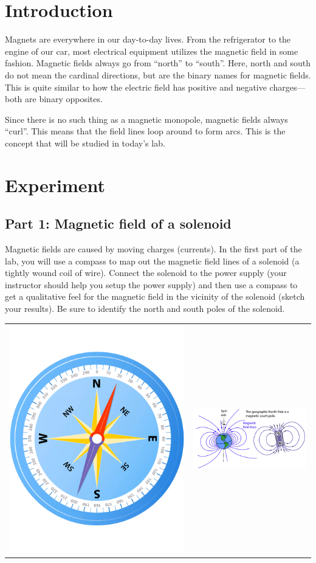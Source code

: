 \documentclass[12pt]{article}
\begin{document}
	\section*{Introduction}
	Magnets are everywhere in our day-to-day lives. From the refrigerator to the engine of our car, most electrical equipment utilizes the magnetic field in some fashion. Magnetic fields always go from ``north'' to ``south''. Here, north and south do not mean the cardinal directions, but are the binary names for magnetic fields. This is quite similar to how the electric field has positive and negative charges---both are binary opposites.
	
	Since there is no such thing as a magnetic monopole, magnetic fields always ``curl''. This means that the field lines loop around to form arcs. This is the concept that will be studied in today's lab.
	
	\section*{Experiment}
	\subsection*{Part 1: Magnetic field of a solenoid}
	Magnetic fields are caused by moving charges (currents). In the first part of the lab, you will use a compass to map out the magnetic field lines of a solenoid (a tightly wound coil of wire). Connect the solenoid to the power supply (your instructor should help you setup the power supply) and then use a compass to get a qualitative feel for the magnetic field in the vicinity of the solenoid (sketch your results). Be sure to identify the north and south poles of the solenoid.
	
	\begin{center}
		\begin{tabular}{cc}
			\includegraphics[width=.4\textwidth]{compass.pdf} &			\includegraphics[width=.7\textwidth]{earth_magfield.png}
		\end{tabular}
	\end{center}
\end{document}
